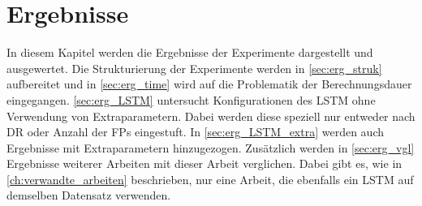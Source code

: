 \chapter{Ergebnisse}\label{ch:erg}

In diesem Kapitel werden die Ergebnisse der Experimente dargestellt und ausgewertet.
Die Strukturierung der Experimente werden in \autoref{sec:erg_struk} aufbereitet und in \autoref{sec:erg_time} wird auf die Problematik der Berechnungsdauer eingegangen.
\autoref{sec:erg_LSTM} untersucht Konfigurationen des \ac{LSTM} ohne Verwendung von Extraparametern.
Dabei werden diese speziell nur entweder nach \ac{DR} oder Anzahl der \acp{FP} eingestuft.
In \autoref{sec:erg_LSTM_extra} werden auch Ergebnisse mit Extraparametern hinzugezogen.
Zusätzlich werden in \autoref{sec:erg_vgl} Ergebnisse weiterer Arbeiten mit dieser Arbeit verglichen.
Dabei gibt es, wie in \autoref{ch:verwandte_arbeiten} beschrieben, nur eine Arbeit, die ebenfalls ein \ac{LSTM} auf demselben Datensatz verwenden.


